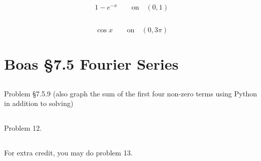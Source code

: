 \documentclass[12pt]{article}
\begin{document}
\subsection{}
\begin{equation}
  1 - e^{-x} \qquad \textrm{on} \quad (0,1)
\end{equation}

\subsection{}
\begin{equation}
  \cos x \qquad \textrm{on} \quad (0,3\pi)
\end{equation}



\section{Boas \S7.5 Fourier Series}

\subsection{}
Problem \S7.5.9 (also graph the sum of the first four non-zero terms using Python in
addition to solving)

\subsection{}
Problem 12.

\subsection{}
For extra credit, you may do problem 13.
\end{document}
